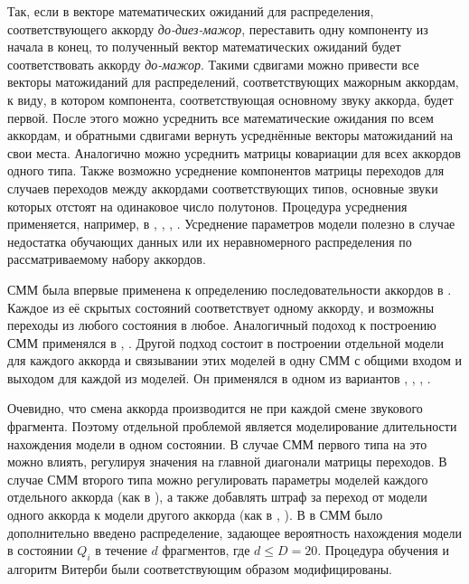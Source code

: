 Так, если в векторе математических ожиданий для распределения, соответствующего
аккорду \emph{до-диез-мажор}, переставить одну компоненту из начала в конец, то
полученный вектор математических ожиданий будет соответствовать аккорду
\emph{до-мажор}. Такими сдвигами можно привести все векторы матожиданий для
распределений, соответствующих мажорным аккордам, к виду, в котором компонента,
соответствующая основному звуку аккорда, будет первой. После этого можно
усреднить все математические ожидания по всем аккордам, и обратными сдвигами
вернуть усреднённые векторы матожиданий на свои места. Аналогично можно
усреднить матрицы ковариации для всех аккордов одного типа. Также возможно
усреднение компонентов матрицы переходов для случаев переходов между аккордами
соответствующих типов, основные звуки которых отстоят на одинаковое число
полутонов. Процедура усреднения применяется, например, в \cite{Sheh2003},
\cite{Papadopoulos2007}, \cite{Cho2010}, \cite{Khadkevich2011}. Усреднение
параметров модели полезно в случае недостатка обучающих данных или их
неравномерного распределения по рассматриваемому набору аккордов.

СММ была впервые применена к определению последовательности аккордов в
\cite{Sheh2003}. Каждое из её скрытых состояний соответствует одному аккорду, и
возможны переходы из любого состояния в любое. Аналогичный подоход к построению
СММ применялся в \cite{Bello2005}, \cite{Lee2007}. Другой подход состоит в
построении отдельной модели для каждого аккорда и связывании этих моделей в
одну СММ с общими входом и выходом для каждой из моделей. Он применялся в одном
из вариантов \cite{Burgoyne2007}, \cite{Mauch2008}, \cite{Khadkevich2009},
\cite{Khadkevich2011}.

Очевидно, что смена аккорда производится не при каждой смене звукового
фрагмента. Поэтому отдельной проблемой является моделирование длительности
нахождения модели в одном состоянии. В случае СММ первого типа на это можно
влиять, регулируя значения на главной диагонали матрицы переходов. В случае СММ
второго типа можно регулировать параметры моделей каждого отдельного аккорда
(как в \cite{Mauch2008}), а также добавлять штраф за переход от модели одного
аккорда к модели другого аккорда (как в \cite{Khadkevich2009},
\cite{Khadkevich2011}). В \cite{Chen2012} в СММ было дополнительно введено
распределение, задающее вероятность нахождения модели в состоянии $Q_i$ в
течение $d$ фрагментов, где $d \leq D=20$. Процедура обучения и алгоритм Витерби
были соответствующим образом модифицированы.

